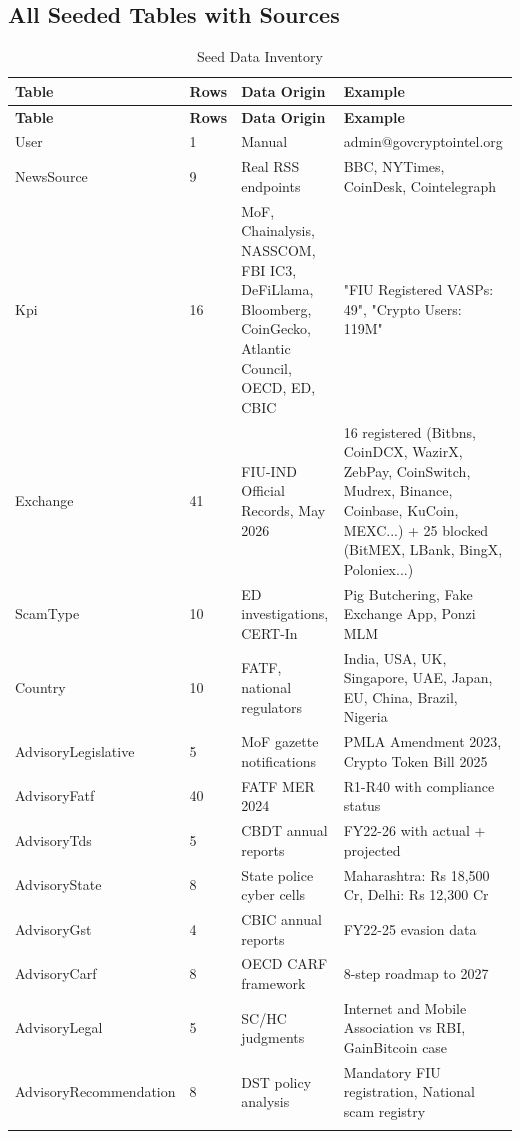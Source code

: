 \documentclass[12pt,a4paper]{article}
\begin{document}
\subsection{All Seeded Tables with Sources}

\begin{longtable}{p{3cm}p{1.5cm}p{2.5cm}p{5cm}}
\toprule
\textbf{Table} & \textbf{Rows} & \textbf{Data Origin} & \textbf{Example} \\
\midrule
\endfirsthead
\toprule
\textbf{Table} & \textbf{Rows} & \textbf{Data Origin} & \textbf{Example} \\
\midrule
\endhead
User & 1 & Manual & admin@govcryptointel.org \\
NewsSource & 9 & Real RSS endpoints & BBC, NYTimes, CoinDesk, Cointelegraph \\
Kpi & 16 & MoF, Chainalysis, NASSCOM, FBI IC3, DeFiLlama, Bloomberg, CoinGecko, Atlantic Council, OECD, ED, CBIC & "FIU Registered VASPs: 49", "Crypto Users: 119M" \\
Exchange & 41 & FIU-IND Official Records, May 2026 & 16 registered (Bitbns, CoinDCX, WazirX, ZebPay, CoinSwitch, Mudrex, Binance, Coinbase, KuCoin, MEXC...) + 25 blocked (BitMEX, LBank, BingX, Poloniex...) \\
ScamType & 10 & ED investigations, CERT-In & Pig Butchering, Fake Exchange App, Ponzi MLM \\
Country & 10 & FATF, national regulators & India, USA, UK, Singapore, UAE, Japan, EU, China, Brazil, Nigeria \\
AdvisoryLegislative & 5 & MoF gazette notifications & PMLA Amendment 2023, Crypto Token Bill 2025 \\
AdvisoryFatf & 40 & FATF MER 2024 & R1-R40 with compliance status \\
AdvisoryTds & 5 & CBDT annual reports & FY22-26 with actual + projected \\
AdvisoryState & 8 & State police cyber cells & Maharashtra: Rs 18,500 Cr, Delhi: Rs 12,300 Cr \\
AdvisoryGst & 4 & CBIC annual reports & FY22-25 evasion data \\
AdvisoryCarf & 8 & OECD CARF framework & 8-step roadmap to 2027 \\
AdvisoryLegal & 5 & SC/HC judgments & Internet and Mobile Association vs RBI, GainBitcoin case \\
AdvisoryRecommendation & 8 & DST policy analysis & Mandatory FIU registration, National scam registry \\
\bottomrule
\caption{Seed Data Inventory}
\label{tab:seed}
\end{longtable}
\end{document}
